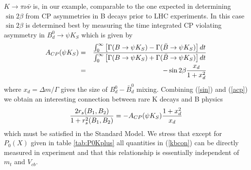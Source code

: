 $K\to\pi\nu\bar\nu$ is, in our example, comparable to the one expected
in determining $\sin 2\beta$ from CP asymmetries in B decays prior to
LHC experiments.  In this case $\sin 2\beta$ is determined best by
measuring the time integrated CP violating asymmetry in $B^0_d\to\psi
K_S$ which is given by
\begin{eqnarray}
A_{CP}(\psi K_S) &=& \frac{
 \int^\infty_0\left[\Gamma(B\to\psi K_S)-\Gamma(\bar B\to\psi K_S)\right] dt}
{\int^\infty_0\left[\Gamma(B\to\psi K_S)+\Gamma(\bar B\to\psi K_S)\right] dt}
\nonumber \\
 &=& -\sin 2\beta {x_d\over 1+x^2_d}
\label{acp}
\end{eqnarray}
where $x_d=\Delta m/\Gamma$ gives the size of $B^0_d-\bar B^0_d$
mixing. Combining (\ref{sin}) and (\ref{acp}) we obtain an
interesting connection between rare K decays and B physics
\begin{equation}\label{kbcon}
{2 r_s(B_1,B_2)\over 1+r^2_s(B_1,B_2)}=-A_{CP}(\psi K_S){1+x^2_d\over x_d}
\end{equation}
which must be satisfied in the Standard Model. We stress that except
for $P_0(X)$ given in table \ref{tab:P0Kplus} all quantities in
(\ref{kbcon}) can be directly measured in experiment and that this
relationship is essentially independent of $m_t$ and $V_{cb}$.
